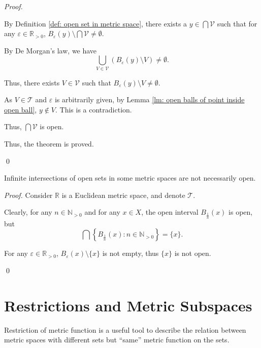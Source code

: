 \begin{theorem}
\begin{proof}
\begin{enumerate}[\bf O1.]
				By Definition \ref{def: open set in metric space}, there exists a $y \in \bigcap \mathcal V$ such that for any $\varepsilon \in \mathbb R_{> 0}$, $B_\varepsilon(y) \setminus \bigcap \mathcal V \ne \emptyset$.
				
				By De Morgan's law, we have
				$$
				\bigcup_{V \in \mathcal V}(B_\varepsilon (y) \setminus V) \ne \emptyset.
				$$
				
				Thus, there exists $V \in \mathcal V$ such that $B_\varepsilon (y) \setminus V \ne \emptyset$.
				
				As $V \in \mathcal T$ and $\varepsilon$ is arbitrarily given, by Lemma \ref{lm: open balls of point inside open ball}, $y \notin V$. This is a contradiction.
				
				Thus, $\bigcap \mathcal V$ is open.
				
				\qedlm
		\end{enumerate}
		
		Thus, the theorem is proved.
		
		\qed
	\end{proof}
\end{theorem}


\begin{theorem}
	Infinite intersections of open sets in some metric spaces are not necessarily open.
	
	\begin{proof}
		Consider $\mathbb R$ is a Euclidean metric space, and denote $\mathcal T$.
		
		Clearly, for any $n \in \mathbb N_{> 0}$ and for any $x \in X$, the open interval $B_{\frac{1}{n}}(x)$ is open, but
		$$
		\bigcap\left\{ B_{\frac{1}{n}}\left( x \right) : n \in \mathbb N_{> 0} \right\} = \{ x \} .
		$$
		
		For any $\varepsilon \in \mathbb R_{> 0}$, $B_\varepsilon(x) \setminus \{x\}$ is not empty, thus $\{x\}$ is not open.
		
		\qed
	\end{proof}
\end{theorem}


\section{Restrictions and Metric Subspaces}


Restriction of metric function is a useful tool to describe the relation between metric spaces with different sets but ``same'' metric function on the sets.


